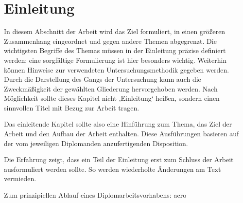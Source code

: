 \section{Einleitung}
In diesem Abschnitt \citep[siehe auch][]{Gubbi2013} der Arbeit wird das Ziel formuliert, in einen größeren Zusammenhang eingeordnet und gegen andere Themen abgegrenzt. Die wichtigsten Begriffe des Themas müssen in der Einleitung präzise definiert werden; eine sorgfältige Formulierung ist hier besonders wichtig. Weiterhin können Hinweise zur verwendeten Untersuchungsmethodik gegeben werden. Durch die Darstellung des Gangs der Untersuchung kann auch die Zweckmäßigkeit der gewählten Gliederung hervorgehoben werden.  Nach Möglichkeit sollte dieses Kapitel nicht ‚Einleitung‘ heißen, sondern einen sinnvollen Titel mit Bezug zur Arbeit tragen.

Das einleitende Kapitel sollte also eine Hinführung zum Thema, das Ziel der Arbeit und den Aufbau der Arbeit enthalten. Diese Ausführungen basieren auf der vom jeweiligen Diplomanden anzufertigenden Disposition.

Die Erfahrung zeigt, dass ein Teil der Einleitung erst zum Schluss der Arbeit ausformuliert  werden sollte. So werden wiederholte Änderungen am Text vermieden.

Zum prinzipiellen Ablauf eines Diplomarbeitsvorhabens: \ac{acro}

